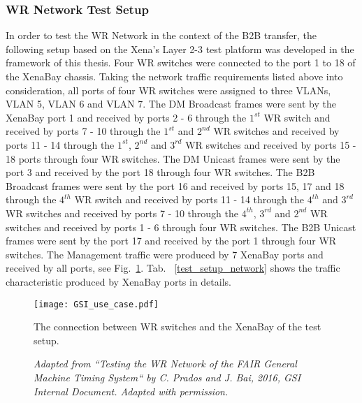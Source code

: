 \subsubsection{WR Network Test Setup}
In order to test the WR Network in the context of the B2B transfer, the following setup based on the Xena's Layer 2-3 test platform was developed in the framework of this thesis. Four WR switches were connected to the port 1 to 18 of the XenaBay chassis. Taking the network traffic requirements listed above into consideration, all ports of four WR switches were assigned to three VLANs, VLAN 5, VLAN 6 and VLAN 7. The DM Broadcast frames were sent by the XenaBay port 1 and received by ports 2 - 6 through the $1^{st}$ WR switch and received by ports 7 - 10 through the $1^{st}$ and $2^{nd}$ WR switches and received by ports 11 - 14 through the $1^{st}$, $2^{nd}$ and $3^{rd}$ WR switches and received by ports 15 - 18 ports through four WR switches. The DM Unicast frames were sent by the port 3 and received by the port 18 through four WR switches. The B2B Broadcast frames were sent by the port 16 and received by ports 15, 17 and 18 through the $4^{th}$ WR switch and received by ports 11 - 14 through the $4^{th}$ and $3^{rd}$ WR switches and received by ports 7 - 10 through the $4^{th}$, $3^{rd}$ and $2^{nd}$ WR switches and received by ports 1 - 6 through four WR switches. The B2B Unicast frames were sent by the port 17 and received by the port 1 through four WR switches. The Management traffic were produced by 7 XenaBay ports and received by all ports, see Fig.~\ref{GSI_use_case.jpg}.  Tab. ~\ref{test_setup_network} shows the traffic characteristic produced by XenaBay ports in details. 
\begin{figure}[H]
   \centering   
   \texttt{[image: GSI\_use\_case.pdf]}
   \caption{The connection between WR switches and the XenaBay of the test setup.}
    \caption*{\textsl{\small{Adapted from ``Testing the WR Network of the FAIR General Machine Timing System`` by C. Prados and J. Bai, 2016, GSI Internal Document. Adapted with permission.}}}
   \label{GSI_use_case.jpg}
\end{figure}

